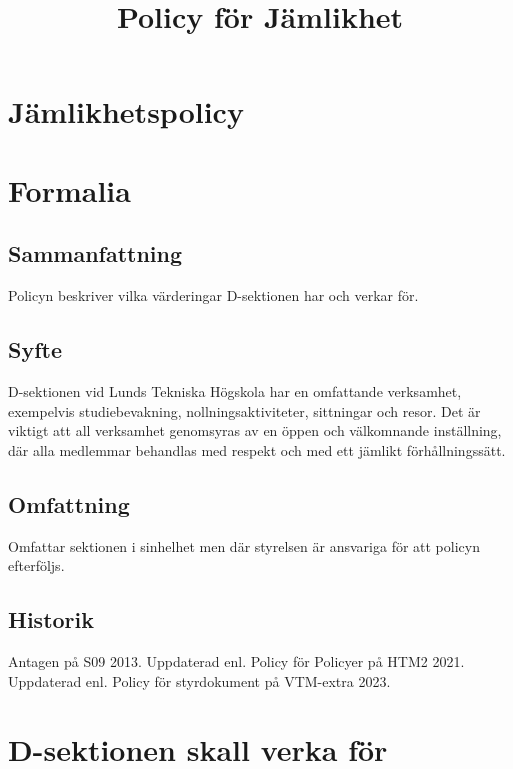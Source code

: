 \documentclass{dsekprotokoll}
\title{Policy för Jämlikhet}
\author{}
\begin{document}
\section*{Jämlikhetspolicy}
\section{Formalia}
\subsection{Sammanfattning}
Policyn beskriver vilka värderingar D-sektionen har och verkar för.
\subsection{Syfte}
D-sektionen vid Lunds Tekniska Högskola har en omfattande verksamhet,
exempelvis studiebevakning, nollningsaktiviteter, sittningar och
resor. Det är viktigt att all verksamhet
genomsyras av en öppen och välkomnande inställning, där alla
medlemmar behandlas med
respekt och med ett jämlikt förhållningssätt.
\subsection{Omfattning}
Omfattar sektionen i sinhelhet men där styrelsen är ansvariga för att
policyn efterföljs.
\subsection{Historik}
Antagen på S09 2013.
Uppdaterad enl. Policy för Policyer på HTM2 2021. Uppdaterad enl.
Policy för styrdokument på VTM-extra 2023.

\section{D-sektionen skall verka för}
\end{document}
